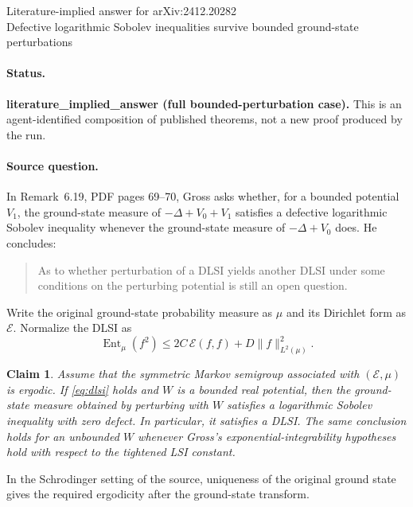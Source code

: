 \documentclass[11pt]{article}
\newtheorem*{claim}{Claim}
\begin{document}
\begin{center}
{\Large Literature-implied answer for arXiv:2412.20282}\\[4pt]
{\large Defective logarithmic Sobolev inequalities survive bounded
ground-state perturbations}
\end{center}

\paragraph{Status.}
\textbf{literature\_implied\_answer (full bounded-perturbation case).}
This is an agent-identified composition of published theorems, not a new proof
produced by the run.

\paragraph{Source question.}
In Remark~6.19, PDF pages 69--70, Gross asks whether, for a bounded potential
$V_1$, the ground-state measure of $-\Delta+V_0+V_1$ satisfies a defective
logarithmic Sobolev inequality whenever the ground-state measure of
$-\Delta+V_0$ does.  He concludes:
\begin{quote}
As to whether perturbation of a DLSI yields another DLSI under some
conditions on the perturbing potential is still an open question.
\end{quote}

Write the original ground-state probability measure as $\mu$ and its
Dirichlet form as $\mathcal E$.  Normalize the DLSI as
\begin{equation}
 \operatorname{Ent}_{\mu}(f^2)
 \leq 2C\,\mathcal E(f,f)+D\lVert f\rVert_{L^2(\mu)}^2.
 \label{eq:dlsi}
\end{equation}

\begin{claim}
Assume that the symmetric Markov semigroup associated with
$(\mathcal E,\mu)$ is ergodic.  If \eqref{eq:dlsi} holds and $W$ is a bounded real
potential, then the ground-state measure obtained by perturbing with $W$
satisfies a logarithmic Sobolev inequality with zero defect.  In particular,
it satisfies a DLSI.  The same conclusion holds for an unbounded $W$ whenever
Gross's exponential-integrability hypotheses hold with respect to the
tightened LSI constant.
\end{claim}

In the Schrodinger setting of the source, uniqueness of the original ground
state gives the required ergodicity after the ground-state transform.
\end{document}
